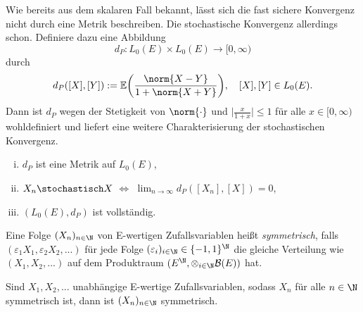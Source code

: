 Wie bereits aus dem skalaren Fall bekannt, lässt sich die fast sichere Konvergenz nicht durch eine Metrik beschreiben. Die stochastische Konvergenz allerdings schon. 
Definiere dazu eine Abbildung 
    $$d_P : L_0(E) \times L_0(E) \to [0,\infty)$$
 durch
\begin{align}
    d_P([X],[Y]) := \mathbb{E}\bigg(\frac{\norm{X-Y}}{1+\norm{X+Y}}\bigg), \quad [X], [Y] \in L_0(E).  
\end{align}
Dann ist $d_P$ wegen der Stetigkeit von $\norm{\cdot}$ und $\big\lvert\frac{x}{1+x}\big\rvert \leq 1$ für alle $x \in [0, \infty)$ wohldefiniert
und liefert eine weitere Charakterisierung der stochastischen Konvergenz. 
\begin{proposition}
    \begin{enumerate}[(i)]
        \item $d_P$ ist eine Metrik auf $L_0(E)$,
        \item $X_n \stochastisch X$ $\iff$ $\lim_{n \to \infty}d_P([X_n], [X]) = 0$,
        \item $(L_0(E), d_P)$ ist vollständig. 
    \end{enumerate}
\end{proposition}


\begin{mydef}%
    Eine Folge $(X_n)_{n \in \N}$ von E-wertigen Zufallsvariablen heißt \textit{symmetrisch}, 
    falls $(\varepsilon_1 X_1, \varepsilon_2 X_2,...)$ für jede Folge $(\varepsilon_i)_{i \in \N} \in \{-1,1\}^{\N}$ die gleiche Verteilung wie $(X_1,X_2,...)$ auf dem Produktraum $(E^{\N}, \otimes_{i \in \N}\mathcal{B}(E))$ hat. 
\end{mydef}

\begin{remark}
   Sind $X_1,X_2,...$ unabhängige E-wertige Zufallsvariablen, sodass $X_n$ für alle $n \in \N$ symmetrisch ist, dann ist $(X_n)_{n \in \N}$ symmetrisch. 
\end{remark}